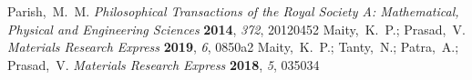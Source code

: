 \documentclass[journal=jaccck,manuscript=article]{achemso}
\begin{document}
\begin{mcitethebibliography}{16}
		Parish,~M.~M. \emph{Philosophical Transactions of the Royal Society A:
			Mathematical, Physical and Engineering Sciences} \textbf{2014}, \emph{372},
		20120452\relax
		\mciteBstWouldAddEndPuncttrue
		\mciteSetBstMidEndSepPunct{\mcitedefaultmidpunct}
		{\mcitedefaultendpunct}{\mcitedefaultseppunct}\relax
		\EndOfBibitem
		Maity,~K.~P.; Prasad,~V. \emph{Materials Research Express} \textbf{2019},
		\emph{6}, 0850a2\relax
		\mciteBstWouldAddEndPuncttrue
		\mciteSetBstMidEndSepPunct{\mcitedefaultmidpunct}
		{\mcitedefaultendpunct}{\mcitedefaultseppunct}\relax
		\EndOfBibitem
		Maity,~K.~P.; Tanty,~N.; Patra,~A.; Prasad,~V. \emph{Materials Research
			Express} \textbf{2018}, \emph{5}, 035034\relax
		\mciteBstWouldAddEndPuncttrue
		\mciteSetBstMidEndSepPunct{\mcitedefaultmidpunct}
		{\mcitedefaultendpunct}{\mcitedefaultseppunct}\relax
		\EndOfBibitem
\end{mcitethebibliography}
	
\end{document}
